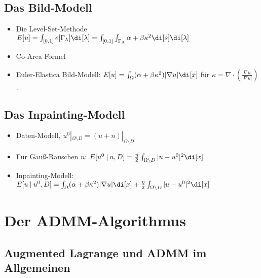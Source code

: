\documentclass{mythesis}
\begin{document}
\subsection{Das Bild-Modell}

\begin{itemize}
    \item
	Die Level-Set-Methode
	\begin{math}
	    E[u] = \int_{[0,1]} e[\Gamma_\lambda] \di[\lambda]
	    = \int_{[0,1]} \int_{\Gamma_\Lambda} \alpha + \beta \kappa^2 \di[s] \di[\lambda]
	\end{math}
    \item
	Co-Area Formel
    \item
	Euler-Elastica Bild-Modell:
	\begin{math}
	    E[u] = \int_{\Omega} (\alpha + \beta \kappa^2) |\nabla u| \di[x]
	\end{math}
	für $\kappa = \nabla \cdot (\frac{\nabla u}{|\nabla u|})$.
\end{itemize}

\subsection{Das Inpainting-Modell}

\begin{itemize}
    \item
	Daten-Modell, $u^0|_{\Omega\setminus D} = (u + n)|_{\Omega\setminus D}$
    \item
	Für Gauß-Rauschen $n$:
	\begin{math}
	    E[u^0 \st u, D] = \frac{\eta}{2} \int_{\Omega \setminus D} |u - u^0|^2 \di[x]
	\end{math}
    \item
	Inpainting-Modell:
	\begin{math}
	    E[u \st u^0, D]
	    = \int_\Omega (\alpha + \beta \kappa^2) |\nabla u| \di[x] + \frac{\eta}{2} \int_{\Omega\setminus D} |u - u^0|^2 \di[x]
	\end{math}
\end{itemize}

\section{Der ADMM-Algorithmus}

\subsection{Augmented Lagrange und ADMM im Allgemeinen}
\end{document}
